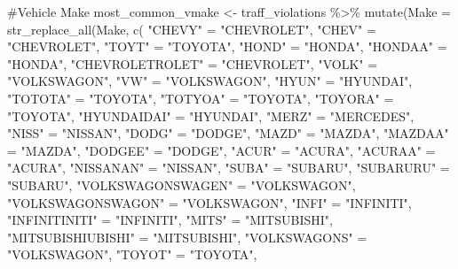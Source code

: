 \documentclass[
  letterpaper,
  DIV=11,
  numbers=noendperiod]{scrartcl}
\newenvironment{Shaded}{\begin{snugshade}}{\end{snugshade}}
\newcommand{\AttributeTok}[1]{\textcolor[rgb]{0.40,0.45,0.13}{#1}}
\newcommand{\CommentTok}[1]{\textcolor[rgb]{0.37,0.37,0.37}{#1}}
\newcommand{\FunctionTok}[1]{\textcolor[rgb]{0.28,0.35,0.67}{#1}}
\newcommand{\NormalTok}[1]{\textcolor[rgb]{0.00,0.23,0.31}{#1}}
\newcommand{\OtherTok}[1]{\textcolor[rgb]{0.00,0.23,0.31}{#1}}
\newcommand{\SpecialCharTok}[1]{\textcolor[rgb]{0.37,0.37,0.37}{#1}}
\newcommand{\StringTok}[1]{\textcolor[rgb]{0.13,0.47,0.30}{#1}}
\begin{document}
\begin{Shaded}
\begin{Highlighting}[]
\CommentTok{\#Vehicle Make}
\NormalTok{most\_common\_vmake }\OtherTok{\textless{}{-}}\NormalTok{ traff\_violations }\SpecialCharTok{\%\textgreater{}\%}
  \FunctionTok{mutate}\NormalTok{(}\AttributeTok{Make =} \FunctionTok{str\_replace\_all}\NormalTok{(Make, }\FunctionTok{c}\NormalTok{(}
    \StringTok{"CHEVY"} \OtherTok{=} \StringTok{"CHEVROLET"}\NormalTok{,}
    \StringTok{"CHEV"} \OtherTok{=} \StringTok{"CHEVROLET"}\NormalTok{,}
    \StringTok{"TOYT"} \OtherTok{=} \StringTok{"TOYOTA"}\NormalTok{,}
    \StringTok{"HOND"} \OtherTok{=} \StringTok{"HONDA"}\NormalTok{,}
    \StringTok{"HONDAA"} \OtherTok{=} \StringTok{"HONDA"}\NormalTok{,}
    \StringTok{"CHEVROLETROLET"} \OtherTok{=} \StringTok{"CHEVROLET"}\NormalTok{,}
    \StringTok{"VOLK"} \OtherTok{=} \StringTok{"VOLKSWAGON"}\NormalTok{,}
    \StringTok{"VW"} \OtherTok{=} \StringTok{"VOLKSWAGON"}\NormalTok{,}
    \StringTok{"HYUN"} \OtherTok{=} \StringTok{"HYUNDAI"}\NormalTok{,}
    \StringTok{"TOTOTA"} \OtherTok{=} \StringTok{"TOYOTA"}\NormalTok{,}
    \StringTok{"TOTYOA"} \OtherTok{=} \StringTok{"TOYOTA"}\NormalTok{,}
    \StringTok{"TOYORA"} \OtherTok{=} \StringTok{"TOYOTA"}\NormalTok{,}
    \StringTok{"HYUNDAIDAI"} \OtherTok{=} \StringTok{"HYUNDAI"}\NormalTok{,}
    \StringTok{"MERZ"} \OtherTok{=} \StringTok{"MERCEDES"}\NormalTok{,}
    \StringTok{"NISS"} \OtherTok{=} \StringTok{"NISSAN"}\NormalTok{,}
    \StringTok{"DODG"} \OtherTok{=} \StringTok{"DODGE"}\NormalTok{,}
    \StringTok{"MAZD"} \OtherTok{=} \StringTok{"MAZDA"}\NormalTok{,}
    \StringTok{"MAZDAA"} \OtherTok{=} \StringTok{"MAZDA"}\NormalTok{,}
    \StringTok{"DODGEE"} \OtherTok{=} \StringTok{"DODGE"}\NormalTok{,}
    \StringTok{"ACUR"} \OtherTok{=} \StringTok{"ACURA"}\NormalTok{,}
    \StringTok{"ACURAA"} \OtherTok{=} \StringTok{"ACURA"}\NormalTok{,}
    \StringTok{"NISSANAN"} \OtherTok{=} \StringTok{"NISSAN"}\NormalTok{,}
    \StringTok{"SUBA"} \OtherTok{=} \StringTok{"SUBARU"}\NormalTok{,}
    \StringTok{"SUBARURU"} \OtherTok{=} \StringTok{"SUBARU"}\NormalTok{,}
    \StringTok{"VOLKSWAGONSWAGEN"} \OtherTok{=} \StringTok{"VOLKSWAGON"}\NormalTok{,}
    \StringTok{"VOLKSWAGONSWAGON"} \OtherTok{=} \StringTok{"VOLKSWAGON"}\NormalTok{,}
    \StringTok{"INFI"} \OtherTok{=} \StringTok{"INFINITI"}\NormalTok{,}
    \StringTok{"INFINITINITI"} \OtherTok{=} \StringTok{"INFINITI"}\NormalTok{,}
    \StringTok{"MITS"} \OtherTok{=} \StringTok{"MITSUBISHI"}\NormalTok{,}
    \StringTok{"MITSUBISHIUBISHI"} \OtherTok{=} \StringTok{"MITSUBISHI"}\NormalTok{,}
    \StringTok{"VOLKSWAGONS"} \OtherTok{=} \StringTok{"VOLKSWAGON"}\NormalTok{,}
    \StringTok{"TOYOT"} \OtherTok{=} \StringTok{"TOYOTA"}\NormalTok{,}

\end{Highlighting}
\end{Shaded}
\end{document}

